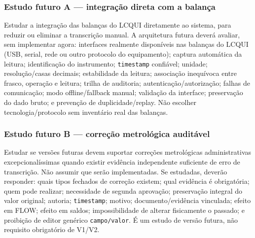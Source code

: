 \subsubsection{Estudo futuro A — integração direta com a balança}
Estudar a integração das balanças do LCQUI diretamente ao sistema, para reduzir ou eliminar a transcrição manual. A arquitetura futura deverá avaliar, sem implementar agora: interfaces realmente disponíveis nas balanças do LCQUI (USB, serial, rede ou outro protocolo do equipamento); captura automática da leitura; identificação do instrumento; \texttt{timestamp} confiável; unidade; resolução/casas decimais; estabilidade da leitura; associação inequívoca entre frasco, operação e leitura; trilha de auditoria; autenticação/autorização; falhas de comunicação; modo offline/fallback manual; validação da interface; preservação do dado bruto; e prevenção de duplicidade/replay. Não escolher tecnologia/protocolo sem inventário real das balanças.

\subsubsection{Estudo futuro B — correção metrológica auditável}
Estudar se versões futuras devem suportar correções metrológicas administrativas excepcionalíssimas quando existir evidência independente suficiente de erro de transcrição. Não assumir que serão implementadas. Se estudadas, deverão responder: quais tipos fechados de correção existem; qual evidência é obrigatória; quem pode realizar; necessidade de segunda aprovação; preservação integral do valor original; autoria; \texttt{timestamp}; motivo; documento/evidência vinculada; efeito em FLOW; efeito em saldos; impossibilidade de alterar fisicamente o passado; e proibição de editor genérico \texttt{campo/valor}. É um estudo de versão futura, não requisito obrigatório de V1/V2.
